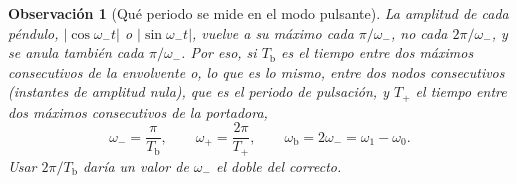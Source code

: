 \documentclass[a4paper,11pt]{amsart}
\numberwithin{equation}{section}
\newcommand{\Tb}{T_{\mathrm{b}}}              %
\newcommand{\Tp}{T_{+}}                       %
\newcommand{\wz}{\omega_0}                    %
\newcommand{\wu}{\omega_1}                    %
\newcommand{\wm}{\omega_{-}}                  %
\newcommand{\wpl}{\omega_{+}}                 %
\theoremstyle{cienplano}
\theoremstyle{ciendef}
\theoremstyle{cienobs}
\newtheorem{observacion}[proposicion]{Observación}
\begin{document}
\begin{observacion}[Qué periodo se mide en el modo pulsante]\label{obs:pulsacion}
La amplitud de cada péndulo, $|\cos\wm t|$ o $|\sin\wm t|$, vuelve a su
máximo cada $\pi/\wm$, no cada $2\pi/\wm$, y se anula también cada
$\pi/\wm$. Por eso, si $\Tb$ es el tiempo entre dos máximos consecutivos de
la envolvente o, lo que es lo mismo, entre dos \emph{nodos} consecutivos
(instantes de amplitud nula), que es el \emph{periodo de pulsación}, y $\Tp$
el tiempo entre dos máximos consecutivos de la portadora,
\begin{equation}\label{eq:periodospuls}
  \wm=\frac{\pi}{\Tb},
  \qquad
  \wpl=\frac{2\pi}{\Tp},
  \qquad
  \omega_{\mathrm{b}}=2\wm=\wu-\wz .
\end{equation}
Usar $2\pi/\Tb$ daría un valor de $\wm$ el doble del correcto.
\end{observacion}
\end{document}
